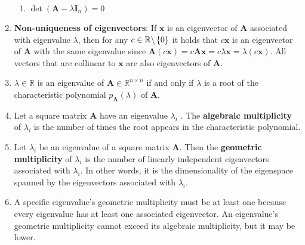 \begin{enumerate}
\begin{enumerate}
        \item $\det(\bm{A} - \lambda \bm{I}_n) = 0$
        \hfill \cite{mfml/book/mml/Deisenroth-Faisal-Ong}
    \end{enumerate}

    \item \textbf{Non-uniqueness of eigenvectors}: If $\bm{x}$ is an eigenvector of $\bm{A}$ associated with eigenvalue $\lambda$, then for any $c \in \mathbb{R}\backslash \left\{0\right\}$ it holds that $c\bm{x}$ is an eigenvector of $\bm{A}$ with the same eigenvalue since $\bm{A}(c\bm{x}) = c\bm{Ax} = c\lambda\bm{x} = \lambda(c\bm{x})$. All vectors that are collinear to $\bm{x}$ are also eigenvectors of $\bm{A}$.
    \hfill \cite{mfml/book/mml/Deisenroth-Faisal-Ong}

    \item 
    \begin{theorem}
        $\lambda  \in \mathbb{R}$ is an eigenvalue of $\bm{A} \in \mathbb{R}^{n\times n}$ if and only if $\lambda$  is a root of the characteristic polynomial $p_{\bm{A}}(\lambda )$ of $\bm{A}$.
        \hfill \cite{mfml/book/mml/Deisenroth-Faisal-Ong}
    \end{theorem}

    \item 
    \begin{definition}
        Let a square matrix $\bm{A}$ have an eigenvalue $\lambda_i$ . 
        The \textbf{algebraic multiplicity} of $\lambda_i$ is the number of times the root appears in the characteristic polynomial.
        \hfill \cite{mfml/book/mml/Deisenroth-Faisal-Ong}
    \end{definition}

    \item
    \begin{definition}
        Let $\lambda_i$ be an eigenvalue of a square matrix $\bm{A}$. 
        Then the \textbf{geometric multiplicity} of $\lambda_i$ is the number of linearly independent eigenvectors associated with $\lambda_i$. 
        In other words, it is the dimensionality of the eigenspace spanned by the eigenvectors associated with $\lambda_i$.
        \hfill \cite{mfml/book/mml/Deisenroth-Faisal-Ong}
    \end{definition}

    \item A specific eigenvalue’s geometric multiplicity must be at least one because every eigenvalue has at least one associated eigenvector. 
    An eigenvalue’s geometric multiplicity cannot exceed its algebraic multiplicity, but it may be lower.


\end{enumerate}
